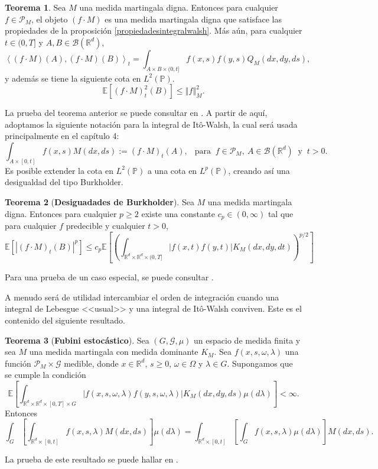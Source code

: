 \documentclass[letterpaper,twoside,12pt]{book}
\newcommand{\R}{\mathbb{R}}
\newcommand{\B}{\mathcal{B}}
\newcommand{\E}{\mathbb{E}}
\renewcommand{\P}{\mathbb{P}}
\newcommand{\1}{\mathds{1}}
\newcommand{\abs}[1]{\left\lvert #1 \right\rvert}
\newcommand{\norm}[1]{\left\Vert #1 \right\Vert}
\theoremstyle{definition}
\theoremstyle{definition}
\newtheorem{teo}{Teorema}
\theoremstyle{remark}
\theoremstyle{definition}
\theoremstyle{definition}
\theoremstyle{definition}
\theoremstyle{definition}
\theoremstyle{definition}
\begin{document}
\begin{teo}\label{integralwalshgeneral}
 Sea $M$ una medida martingala digna. Entonces para cualquier $f\in \mathscr{P}_M$, el objeto $(f\cdot M)$ es una medida martingala digna que satisface las propiedades de la proposición \ref{propiedadesintegralwalsh}. Más aún, para cualquier $t\in (0,T]$ y $A,B\in \B(\R^{d})$, 
 \[
 \left\langle (f\cdot M)(A),(f\cdot M)(B)\right\rangle _t= \int_{A\times B\times (0,t]}f(x,s)f(y,s)Q_M(dx, dy,  ds),
 \]
 y además se tiene la siguiente cota en $L^{2}(\P)$.
 \[
 \E\left[(f\cdot M)^{2}_t(B)\right] \leq \norm{f}_M^{2}.
 \]
 \end{teo}
 La prueba del teorema anterior se puede consultar en \cite[teorema 2.5]{Walsh_J.B_Introduction_to_SPDEs}. A partir de aquí, adoptamos la siguiente notación para la integral de Itô-Walsh, la cual será usada principalmente en el capítulo 4:
 \begin{equation*}
   \int_{A\times [0,t]} f(x,s) M(dx,ds):=(f\cdot M)_t(A), \ \ \text{ para } \ f\in \mathscr{P}_M, \ A\in \B(\R^{d}) \ \text{ y } \ t>0.
 \end{equation*}
  Es posible extender la cota en $L^2(\P)$ a una cota en $L^{p}(\P)$, creando así una desigualdad del tipo Burkholder.
 \begin{teo}[\textbf{Desiguadades de Burkholder}]
  Sea $M$ una medida martingala digna. Entonces para cualquier $p\geq2$ existe una constante $c_p\in (0,\infty)$ tal que para cualquier $f$ predecible y cualquier $t>0$, 
  \[
  \E\left[\abs{(f\cdot M)_t(B)}^p\right]\leq c_p \E\left[\left(\int_{\R^{d}\times \R^{d}\times (0,T]}\abs{f(x,t)f(y,t)}K_M(dx, dy,  dt)\right)^{p/2}\right] 
  \]
  \end{teo}
  Para una prueba de un caso especial, se puede consultar \cite[teorema 5.27]{Khoshnevisan2009}. 

  A menudo será de utilidad intercambiar el orden de integración cuando una integral de Lebesgue <<usual>> y una integral de Itô-Walsh conviven. Este es el contenido del siguiente resultado.
  \begin{teo}[\textbf{Fubini estocástico}]\label{fubiniestocastico}
   Sea $(G, \mathcal{G},\mu)$ un espacio de medida finita y sea $M$ una medida martingala con medida dominante $K_M$. Sea $f(x,s,\omega, \lambda)$ una función $\mathscr{P}_M\times\mathcal{G}$ medible, donde $x\in \R^{d}$, $s\geq0$, $\omega \in \Omega$ y $\lambda \in G$. Supongamos que se cumple la condición
   \[
   \E\left[\int_{\R^{d}\times \R^{d}\times [0,T] \times G} \abs{f(x,s,\omega,\lambda)f(y,s,\omega,\lambda)}K_M(dx, dy, ds)\mu(d\lambda)\right]<\infty.
   \]
   Entonces 
   \[
   \int_G \left[\int_{\R^{d}\times [0,t]}f(x,s,\lambda)M(dx,ds)\right]\mu(d\lambda)= \int_{\R^{d}\times[0,t]}\left[\int_Gf(x,s,\lambda)\mu(d\lambda)\right] M(dx,ds).
   \]
   \end{teo}
   La prueba de este resultado se puede hallar en \cite[teorema 2.6]{Walsh_J.B_Introduction_to_SPDEs}.
\end{document}
